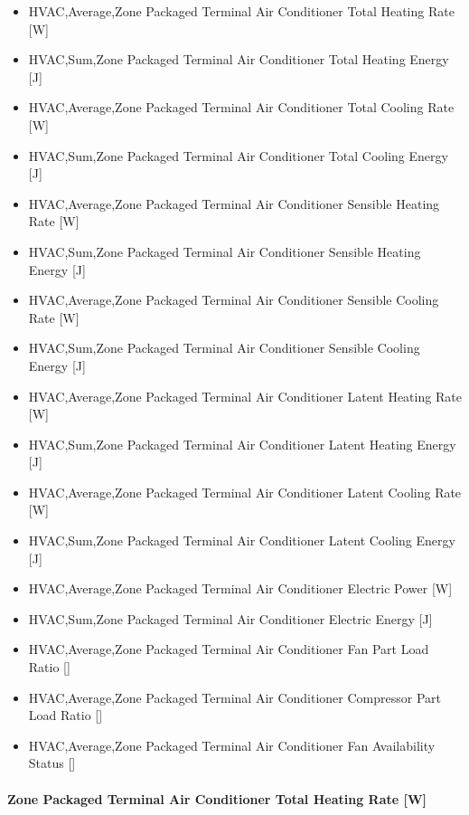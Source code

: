\begin{itemize}
\item
  HVAC,Average,Zone Packaged Terminal Air Conditioner Total Heating Rate {[}W{]}
\item
  HVAC,Sum,Zone Packaged Terminal Air Conditioner Total Heating Energy {[}J{]}
\item
  HVAC,Average,Zone Packaged Terminal Air Conditioner Total Cooling Rate {[}W{]}
\item
  HVAC,Sum,Zone Packaged Terminal Air Conditioner Total Cooling Energy {[}J{]}
\item
  HVAC,Average,Zone Packaged Terminal Air Conditioner Sensible Heating Rate {[}W{]}
\item
  HVAC,Sum,Zone Packaged Terminal Air Conditioner Sensible Heating Energy {[}J{]}
\item
  HVAC,Average,Zone Packaged Terminal Air Conditioner Sensible Cooling Rate {[}W{]}
\item
  HVAC,Sum,Zone Packaged Terminal Air Conditioner Sensible Cooling Energy {[}J{]}
\item
  HVAC,Average,Zone Packaged Terminal Air Conditioner Latent Heating Rate {[}W{]}
\item
  HVAC,Sum,Zone Packaged Terminal Air Conditioner Latent Heating Energy {[}J{]}
\item
  HVAC,Average,Zone Packaged Terminal Air Conditioner Latent Cooling Rate {[}W{]}
\item
  HVAC,Sum,Zone Packaged Terminal Air Conditioner Latent Cooling Energy {[}J{]}
\item
  HVAC,Average,Zone Packaged Terminal Air Conditioner Electric Power {[}W{]}
\item
  HVAC,Sum,Zone Packaged Terminal Air Conditioner Electric Energy {[}J{]}
\item
  HVAC,Average,Zone Packaged Terminal Air Conditioner Fan Part Load Ratio {[]}
\item
  HVAC,Average,Zone Packaged Terminal Air Conditioner Compressor Part Load Ratio {[]}
\item
  HVAC,Average,Zone Packaged Terminal Air Conditioner Fan Availability Status {[]}
\end{itemize}

\paragraph{Zone Packaged Terminal Air Conditioner Total Heating Rate {[}W{]}}\label{zone-packaged-terminal-air-conditioner-total-heating-rate-w}

